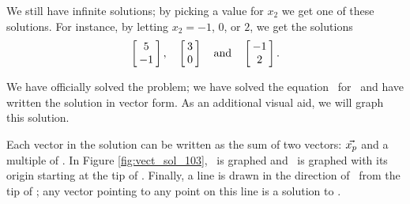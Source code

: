 {We still have infinite solutions; by picking a value for $x_2$ we get one of these solutions. For instance, by letting $x_2= -1$, $0$, or $2$, we get the solutions $$ \bmx{c} 5\\-1\emx, \quad \bmx{c} 3\\0\emx \quad \text{and} \quad \bmx{c} -1\\2\emx.$$


We have officially solved the problem; we have solved the equation \ttaxb\ for \vx\ and have written the solution in vector form. As an additional visual aid, we will graph this solution. 

Each vector in the solution can be written as the sum of two vectors: $\vect{x_p}$ and a multiple of \vv. In Figure \ref{fig:vect_sol_103}, \ is graphed and \vv\ is graphed with its origin starting at the tip of . Finally, a line is drawn in the direction of \vv\ from the tip of ; any vector pointing to any point on this line is a solution to \ttaxb.

\begin{myfigure}%
\begin{center}
\end{center}
\label{fig:vect_sol_103}
\end{myfigure}
\baselineskip}\\

